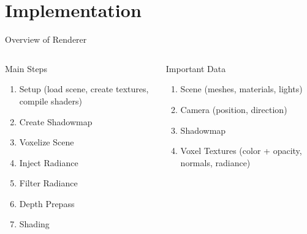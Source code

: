 \documentclass[10pt]{beamer}
\begin{document}
\section{Implementation}

\begin{frame}{Overview of Renderer}

  \begin{columns}
    \begin{column}{0.5\textwidth}
      \begin{block}{Main Steps}
        \begin{enumerate}
          \item Setup (load scene, create textures, compile shaders)
          \item Create Shadowmap
          \item Voxelize Scene
          \item Inject Radiance
          \item Filter Radiance
          \item Depth Prepass
          \item Shading
        \end{enumerate}
      \end{block}
    \end{column}
    \begin{column}{0.5\textwidth}
      \begin{block}{Important Data}
        \begin{enumerate}
          \item Scene (meshes, materials, lights)
          \item Camera (position, direction) %
          \item Shadowmap %
          \item Voxel Textures (color + opacity, normals, radiance)
        \end{enumerate}
      \end{block}
    \end{column}
  \end{columns}
\end{frame}
\end{document}
